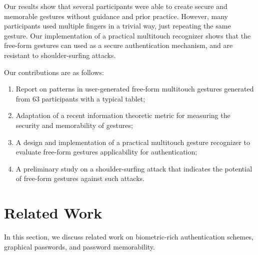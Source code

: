 \documentclass{sig-alternate-10pt}
\begin{document}
Our results show that several participants were able to create secure and memorable gestures without guidance and prior practice. However, many participants
used multiple fingers in a trivial way, just repeating the same gesture. Our implementation of a practical multitouch recognizer shows that the
free-form gestures can used as a secure authentication mechanism, and are resistant to shoulder-surfing attacks.


Our contributions are as follows:
\begin{enumerate}
\item Report on patterns in user-generated free-form multitouch gestures generated from 63 participants with a typical tablet;
\item Adaptation of a recent information theoretic metric for measuring the security and memorability of gestures;
\item A design and implementation of a practical multitouch gesture recognizer to evaluate free-form gestures applicability for authentication;
\item A preliminary study on a shoulder-surfing attack that indicates the potential of free-form gestures against such attacks. 
\end{enumerate}






































\section{Related Work}





In this section, we discuss related work on biometric-rich authentication schemes, graphical passwords, and password memorability.
\end{document}
